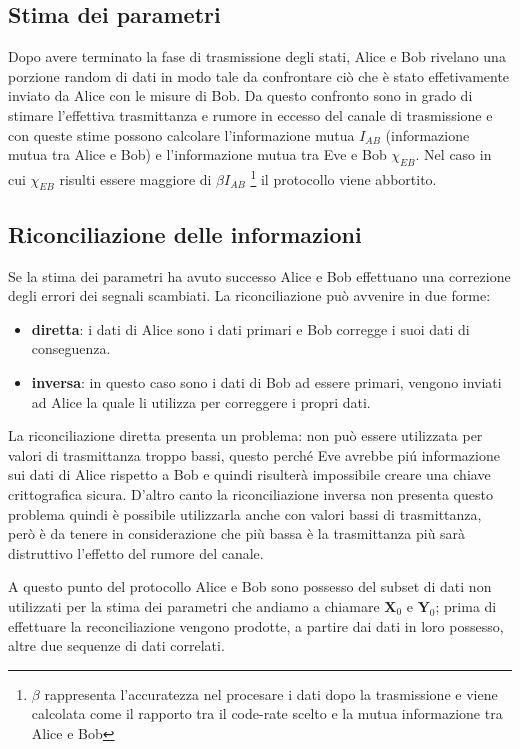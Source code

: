 \subsection{Stima dei parametri}\label{subse:stima-parametri}
Dopo avere terminato la fase di trasmissione degli stati, Alice e Bob rivelano una porzione random di dati in modo tale da confrontare ci\`o che \`e stato effetivamente inviato da Alice con le misure di Bob. Da questo confronto sono in grado di stimare l'effettiva trasmittanza e rumore in eccesso del canale di trasmissione e con queste stime possono calcolare l'informazione mutua $I_{AB}$ (informazione mutua tra Alice e Bob) e l'informazione mutua tra Eve e Bob $\chi_{EB}$. Nel caso in cui $\chi_{EB}$ risulti essere maggiore di $\beta I_{AB}$ \footnote{$\beta$ rappresenta l'accuratezza nel procesare i dati dopo la trasmissione e viene calcolata come il rapporto tra il code-rate scelto e la mutua informazione tra Alice e Bob} il protocollo viene abbortito.

\subsection{Riconciliazione delle informazioni}\label{subse:riconciliazione}
Se la stima dei parametri ha avuto successo Alice e Bob effettuano una correzione degli errori dei segnali scambiati. La riconciliazione pu\`o avvenire in due forme: 

\begin{itemize}
\item \textbf{diretta}: i dati di Alice sono i dati primari e Bob corregge i suoi dati di conseguenza.
\item \textbf{inversa}: in questo caso sono i dati di Bob ad essere primari, vengono inviati ad Alice la quale li utilizza per correggere i propri dati.
\end{itemize} 
 
La riconciliazione diretta presenta un problema: non pu\`o essere utilizzata per valori di trasmittanza troppo bassi, questo perch\'e Eve avrebbe pi\'u informazione sui dati di Alice rispetto a Bob e quindi risulter\`a impossibile creare una chiave crittografica sicura. D'altro canto la riconciliazione inversa non presenta questo problema quindi \`e possibile utilizzarla anche con valori bassi di trasmittanza, per\`o \`e da tenere in considerazione che pi\`u bassa \`e la trasmittanza pi\`u sar\`a distruttivo l'effetto del rumore del canale.\cite{https://doi.org/10.1002/qute.201800011}

A questo punto del protocollo Alice e Bob sono possesso del subset di dati non utilizzati per la stima dei parametri che andiamo a chiamare $\textbf{X}_0$ e $\textbf{Y}_0$; prima di effettuare la reconciliazione vengono prodotte, a partire dai dati in loro possesso, altre due sequenze di dati correlati. 

